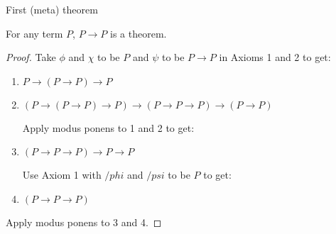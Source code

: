 \documentclass[presentation]{beamer}
\begin{document}
\begin{frame}[label={sec:orgheadline8}]{First (meta) theorem}
\begin{theorem}
For any term \(P\), \(P \rightarrow P\) is a theorem.
\end{theorem}

\begin{proof}
Take \(\phi\) and \(\chi\) to be \(P\) and \(\psi\) to be \(P \rightarrow P\) in Axioms 1 and
2 to get:

\begin{enumerate}
\item \(P \rightarrow (P \rightarrow P) \rightarrow P\)
\item \((P \rightarrow (P \rightarrow P) \rightarrow P) \rightarrow (P \rightarrow P
     \rightarrow P) \rightarrow (P \rightarrow P)\)

Apply modus ponens to 1 and 2 to get:

\item \((P \rightarrow P \rightarrow P) \rightarrow P \rightarrow P\)

Use Axiom 1 with \(/phi\) and \(/psi\) to be \(P\) to get:

\item \((P \rightarrow P \rightarrow P)\)
\end{enumerate}

Apply modus ponens to 3 and 4.
\end{proof}
\end{frame}
\end{document}
